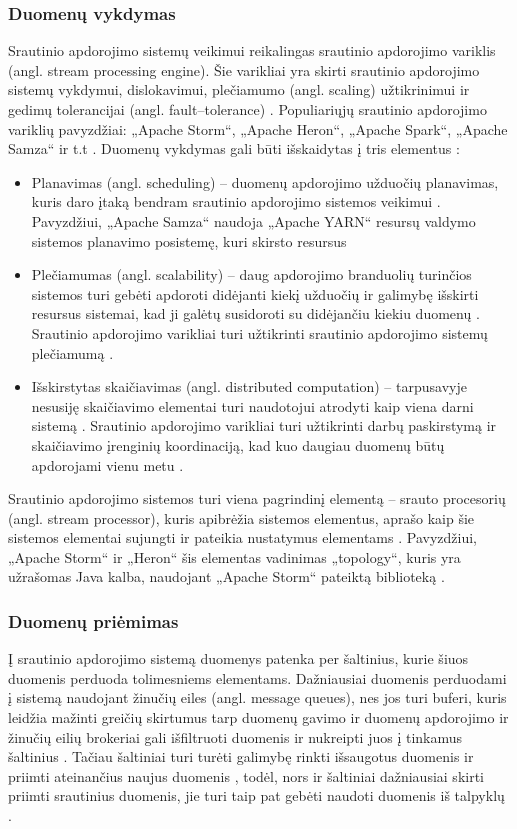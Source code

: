 \documentclass{VUMIFPSbakalaurinis}
\begin{document}
\subsubsection{Duomenų vykdymas}
Srautinio apdorojimo sistemų veikimui reikalingas srautinio apdorojimo variklis (angl. stream processing engine). Šie varikliai yra skirti srautinio apdorojimo sistemų vykdymui, dislokavimui, plečiamumo (angl. scaling) užtikrinimui ir gedimų tolerancijai (angl. fault–tolerance) \cite{zhao2017taxonomy}. Populiariųjų srautinio apdorojimo variklių pavyzdžiai: „Apache Storm“, „Apache Heron“, „Apache Spark“, „Apache Samza“ ir t.t \cite{roger2019comprehensive}. 
Duomenų vykdymas gali būti išskaidytas į tris elementus \cite{zhao2017taxonomy}: 
\begin{itemize}
    \item Planavimas (angl. scheduling) – duomenų apdorojimo užduočių planavimas, kuris daro įtaką bendram srautinio apdorojimo sistemos veikimui \cite{falt2011task}. Pavyzdžiui, „Apache Samza“ naudoja „Apache YARN“ resursų valdymo sistemos planavimo posistemę, kuri skirsto resursus \cite{noghabi2017samza} 
    \item Plečiamumas (angl. scalability) – daug apdorojimo branduolių turinčios sistemos turi gebėti apdoroti didėjanti kiekį užduočių ir galimybę išskirti resursus sistemai, kad ji galėtų susidoroti su didėjančiu kiekiu duomenų \cite{bondi2000characteristics}. Srautinio apdorojimo varikliai turi užtikrinti srautinio apdorojimo sistemų plečiamumą \cite{stonebraker20058}.    
    \item Išskirstytas skaičiavimas (angl. distributed computation) – tarpusavyje nesusiję skaičiavimo elementai turi naudotojui atrodyti kaip viena darni sistemą \cite{tanenbaum2007distributed}. Srautinio apdorojimo varikliai turi užtikrinti darbų paskirstymą ir skaičiavimo įrenginių koordinaciją, kad kuo daugiau duomenų būtų apdorojami vienu metu \cite{zhao2017taxonomy}.
\end{itemize}
Srautinio apdorojimo sistemos turi viena pagrindinį elementą – srauto procesorių (angl. stream processor), kuris apibrėžia sistemos elementus, aprašo kaip šie sistemos elementai sujungti ir pateikia nustatymus elementams \cite{zhao2017taxonomy}. Pavyzdžiui, „Apache Storm“ ir „Heron“ šis elementas vadinimas „topology“, kuris yra užrašomas Java kalba, naudojant „Apache Storm“ pateiktą biblioteką \cite{iqbal2015big}.
\subsubsection{Duomenų priėmimas}
Į srautinio apdorojimo sistemą duomenys patenka per šaltinius, kurie šiuos duomenis perduoda tolimesniems elementams. Dažniausiai duomenis perduodami į sistemą naudojant žinučių eiles (angl. message queues), nes jos turi buferi, kuris leidžia mažinti greičių skirtumus tarp duomenų gavimo ir duomenų apdorojimo ir žinučių eilių brokeriai gali išfiltruoti duomenis ir nukreipti juos į tinkamus šaltinius \cite{kamburugamuve2016survey}. Tačiau šaltiniai turi turėti galimybę rinkti išsaugotus duomenis ir priimti ateinančius naujus duomenis \cite{stonebraker20058}, todėl, nors ir šaltiniai dažniausiai skirti priimti srautinius duomenis, jie turi taip pat gebėti naudoti duomenis iš talpyklų \cite{zhao2017taxonomy}. 
\end{document}
